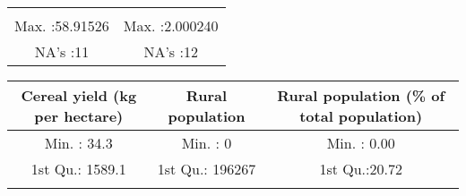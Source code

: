 \documentclass[
]{article}
\begin{document}
\begin{longtable}[]{@{}cc@{}}
\begin{minipage}[t]{0.37\columnwidth}
\end{minipage}\tabularnewline
\begin{minipage}[t]{0.41\columnwidth}\centering
Max. :58.91526\strut
\end{minipage} & \begin{minipage}[t]{0.37\columnwidth}\centering
Max. :2.000240\strut
\end{minipage}\tabularnewline
\begin{minipage}[t]{0.41\columnwidth}\centering
NA's :11\strut
\end{minipage} & \begin{minipage}[t]{0.37\columnwidth}\centering
NA's :12\strut
\end{minipage}\tabularnewline
\bottomrule
\end{longtable}

\begin{longtable}[]{@{}ccc@{}}
\toprule
\begin{minipage}[b]{0.36\columnwidth}\centering
Cereal yield (kg per hectare)\strut
\end{minipage} & \begin{minipage}[b]{0.21\columnwidth}\centering
Rural population\strut
\end{minipage} & \begin{minipage}[b]{0.35\columnwidth}\centering
Rural population (\% of total population)\strut
\end{minipage}\tabularnewline
\midrule
\endhead
\begin{minipage}[t]{0.36\columnwidth}\centering
Min. : 34.3\strut
\end{minipage} & \begin{minipage}[t]{0.21\columnwidth}\centering
Min. : 0\strut
\end{minipage} & \begin{minipage}[t]{0.35\columnwidth}\centering
Min. : 0.00\strut
\end{minipage}\tabularnewline
\begin{minipage}[t]{0.36\columnwidth}\centering
1st Qu.: 1589.1\strut
\end{minipage} & \begin{minipage}[t]{0.21\columnwidth}\centering
1st Qu.: 196267\strut
\end{minipage} & \begin{minipage}[t]{0.35\columnwidth}\centering
1st Qu.:20.72\strut
\end{minipage}\tabularnewline
\begin{minipage}[t]{0.36\columnwidth}\centering

\end{minipage}
\end{longtable}
\end{document}
